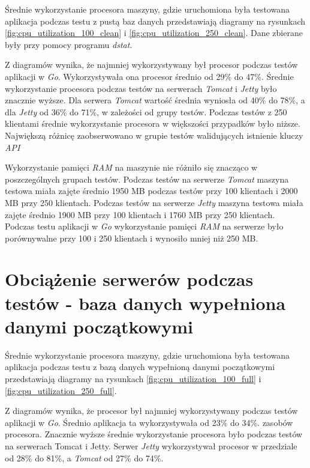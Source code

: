 Średnie wykorzystanie procesora maszyny, gdzie uruchomiona była testowana aplikacja podczas testu z pustą baz danych przedstawiają diagramy na rysunkach \ref{fig:cpu_utilization_100_clean} i \ref{fig:cpu_utilization_250_clean}. Dane zbierane były przy pomocy programu \textsl{dstat}.

Z diagramów wynika, że najmniej wykorzystywany był procesor  podczas testów aplikacji w \textsl{Go}. Wykorzystywała ona procesor średnio od 29\% do 47\%. Średnie wykorzystanie procesora podczas testów na serwerach \textsl{Tomcat} i \textsl{Jetty} było znacznie wyższe. Dla serwera \textsl{Tomcat} wartość średnia wyniosła od 40\% do 78\%, a dla  \textsl{Jetty} od 36\% do 71\%,  w zależości od grupy testów. Podczas testów z 250 klientami średnie wykorzystanie procesora w większości przypadków było niższe. Największą różnicę zaobserwowano w grupie testów walidujących istnienie kluczy \textsl{API}

 Wykorzystanie pamięci \textsl{RAM} na maszynie nie różniło się  znacząco  w poszczególnych grupach testów. Podczas testów na serwerze \textsl{Tomcat} maszyna testowa miała  zajęte średnio 1950 MB podczas testów  przy 100 klientach i 2000 MB przy 250 klientach. Podczas testów na serwerze \textsl{Jetty} maszyna testowa miała zajęte średnio 1900 MB przy 100 klientach  i 1760 MB przy 250 klientach. Podczas testu aplikacji w \textsl{Go} wykorzystanie pamięci \textsl{RAM} na serwerze było porównywalne przy 100 i 250 klientach i wynosiło mniej niż 250 MB. 

% 

\section{Obciążenie serwerów podczas testów - baza danych wypełniona danymi początkowymi}

Średnie wykorzystanie procesora maszyny, gdzie uruchomiona była testowana aplikacja podczas testu z bazą danych wypełnioną danymi początkowymi przedstawiają diagramy 
na rysunkach \ref{fig:cpu_utilization_100_full} i \ref{fig:cpu_utilization_250_full}. 

Z diagramów wynika, że procesor był najmniej wykorzystywany podczas testów aplikacji w \textsl{Go}. Średnio aplikacja ta  wykorzystywała od 23\% do 34\%. zasobów procesora. Znacznie wyższe średnie wykorzystanie procesora było podczas testów na serwerach Tomcat i Jetty. Serwer \textsl{Jetty} wykorzystywał procesor w przedziale od 28\% do 81\%, a \textsl{Tomcat} od 27\% do 74\%.

